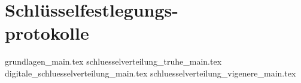 
\part[Schlüsselfestlegungsprotokolle]{Schlüsselfestlegungs-\\protokolle}
\label{part-schluesselfestlegungsprotokolle}

{grundlagen_main.tex}
{schluesselverteilung_truhe_main.tex}
{digitale_schluesselverteilung_main.tex}
{schluesselverteilung_vigenere_main.tex}
